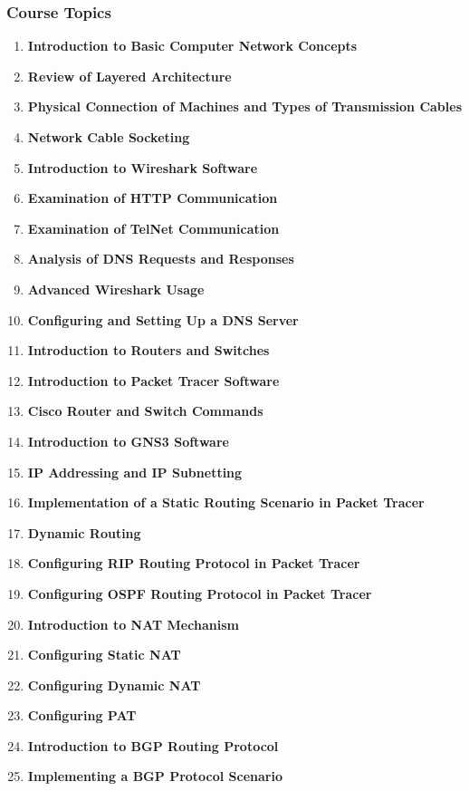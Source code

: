 \documentclass[12pt]{article}
\begin{document}
\subsubsection*{Course Topics}
\begin{enumerate}
    \item \textbf{Introduction to Basic Computer Network Concepts}
    \item \textbf{Review of Layered Architecture}
    \item \textbf{Physical Connection of Machines and Types of Transmission Cables}
    \item \textbf{Network Cable Socketing}
    \item \textbf{Introduction to Wireshark Software}
    \item \textbf{Examination of HTTP Communication}
    \item \textbf{Examination of TelNet Communication}
    \item \textbf{Analysis of DNS Requests and Responses}
    \item \textbf{Advanced Wireshark Usage}
    \item \textbf{Configuring and Setting Up a DNS Server}
    \item \textbf{Introduction to Routers and Switches}
    \item \textbf{Introduction to Packet Tracer Software}
    \item \textbf{Cisco Router and Switch Commands}
    \item \textbf{Introduction to GNS3 Software}
    \item \textbf{IP Addressing and IP Subnetting}
    \item \textbf{Implementation of a Static Routing Scenario in Packet Tracer}
    \item \textbf{Dynamic Routing}
    \item \textbf{Configuring RIP Routing Protocol in Packet Tracer}
    \item \textbf{Configuring OSPF Routing Protocol in Packet Tracer}
    \item \textbf{Introduction to NAT Mechanism}
    \item \textbf{Configuring Static NAT}
    \item \textbf{Configuring Dynamic NAT}
    \item \textbf{Configuring PAT}
    \item \textbf{Introduction to BGP Routing Protocol}
    \item \textbf{Implementing a BGP Protocol Scenario}
\end{enumerate}
\end{document}
